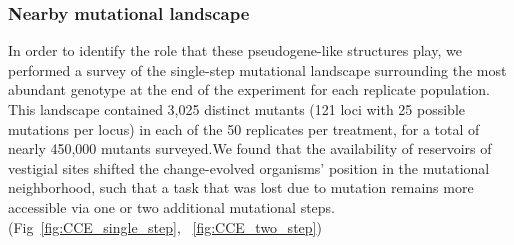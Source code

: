 \documentclass[PhD]{msu-thesis}
\begin{document}
\subsubsection{Nearby mutational landscape}
In order to identify the role that these pseudogene-like structures play, we performed a survey of the single-step mutational landscape surrounding the most abundant genotype at the end of the experiment for each replicate population. This landscape contained 3,025 distinct mutants (121 loci with 25 possible mutations per locus) in each of the 50 replicates per treatment, for a total of nearly 450,000 mutants surveyed.We found that the availability of reservoirs of vestigial sites shifted the change-evolved organisms' position in the mutational neighborhood, such that a task that was lost due to mutation remains more accessible via one or two additional mutational steps. (Fig~\ref{fig:CCE_single_step}, ~\ref{fig:CCE_two_step})
\end{document}
